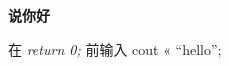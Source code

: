 \documentclass{article}
\newcommand{\problemname}[1]{\begin{center}\Large\bfseries #1\end{center}}
\begin{document}
\problemname{说你好}

在 \textit{return 0;} 前输入 cout « “hello”;
\end{document}

